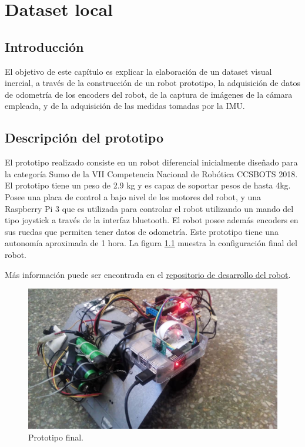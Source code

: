 \chapter{Dataset local}
\label{capitulo5}


\section{Introducción}
El objetivo de este capítulo es explicar la elaboración de un dataset visual inercial, a través de la construcción de un robot prototipo, la adquisición de datos de odometría de los encoders del robot, de la captura de imágenes de la cámara empleada, y de la adquisición de las medidas tomadas por la IMU.


\clearpage

\section{Descripción del prototipo}

El prototipo realizado consiste en un robot diferencial inicialmente diseñado para la categoría Sumo de la VII Competencia Nacional de Robótica CCSBOTS 2018. El prototipo tiene un peso de 2.9 kg y es capaz de soportar pesos de hasta 4kg. Posee una placa de control a bajo nivel de los motores del robot, y una Raspberry Pi 3 que es utilizada para controlar el robot utilizando un mando del tipo joystick a través de la interfaz bluetooth. El robot posee además encoders en sus ruedas que permiten tener datos de odometría. Este prototipo tiene una autonomía aproximada de 1 hora. La figura \ref{imagen:Robot} muestra la configuración final del robot. 

Más información puede ser encontrada en el \href{https://github.com/Robot-Sumo/}{\underline{repositorio de desarrollo del robot}}.


\begin{figure}[H]
	\centering		\includegraphics[width=0.7\linewidth]{imagenes/prototipo/Robot}
	\caption[Prototipo final]{Prototipo final.}
	\label{imagen:Robot}
\end{figure}


